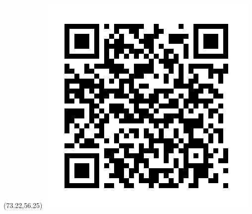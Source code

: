 \documentclass[final,hyperref={pdfpagelabels=false}]{beamer}
\begin{document}
\begin{frame}{}
\begin{columns}[t]
\begin{column}{0.07\linewidth}
\end{column}%
  \end{columns}
\begin{textblock}{14}(73.22,56.25)
\includegraphics[trim=40 40 40 40,clip,scale=.54]{./img/QR.png}
\end{textblock}
\end{frame}
\end{document}
